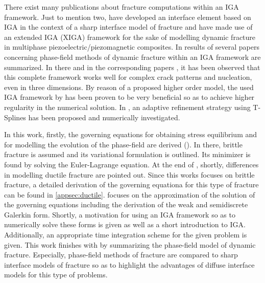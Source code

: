 There exist many publications about fracture computations within an IGA framework. Just to mention two, \citet{19_B_FracIGA1} have developed an interface element based on IGA in the context of a sharp interface model of fracture and \citet{20_B_FracIGA2} have made use of an extended IGA (XIGA) framework for the sake of modelling dynamic fracture in multiphase piezoelectric/piezomagnetic composites. In \citet{11_PF_DissBorden} results of several papers concerning phase-field methods of dynamic fracture within an IGA framework are summarized. In there and in the corresponding papers \cite{03_PF_ductile}\cite{02_PF_HO_brittle}\cite{01_PF_dyn_brittle}, it has been observed that this complete framework works well for complex crack patterns and nucleation, even in three dimensions. By reason of a proposed higher order model, the used IGA framework by \citet{09_B_IGA1} has been proven to be very beneficial so as to achieve higher regularity in the numerical solution. In \cite{01_PF_dyn_brittle}, an adaptive refinement strategy using T-Splines has been proposed and numerically investigated.

In this work, firstly, the governing equations for obtaining stress equilibrium and for modelling the evolution of the phase-field are derived (). In there, brittle fracture is assumed and its variational formulation is outlined. Its minimizer is found by solving the Euler-Lagrange equation. At the end of , shortly, differences in modelling ductile fracture are pointed out. Since this works focuses on brittle fracture, a detailed derivation of the governing equationa for this type of fracture can be found in \ref{appsec:ductile}.  focuses on the approximation of the solution of the governing equations including the derivation of the weak and semidiscrete Galerkin form. Shortly, a motivation for using an IGA framework so as to numerically solve these forms is given as well as a short introduction to IGA. Additionally, an appropriate time integration scheme for the given problem is given. This work finishes with  by summarizing the phase-field model of dynamic fracture. Especially, phase-field methods of fracture are compared to sharp interface models of fracture so as to highlight the advantages of diffuse interface models for this type of problems.




